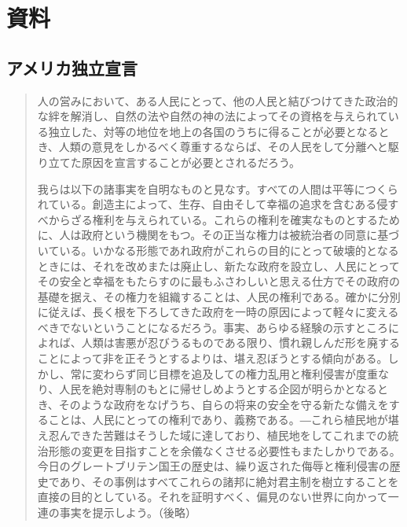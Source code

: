 \documentclass[uplatex,dvipdfmx]{jsarticle} \usepackage{mystyle}%
\begin{document}
\section{資料}



\subsection{アメリカ独立宣言}

\begin{quote}\footnotesize{}
  人の営みにおいて、ある人民にとって、他の人民と結びつけてきた政治的な絆を解消し、自然の法や自然の神の法によってその資格を与えられている独立した、対等の地位を地上の各国のうちに得ることが必要となるとき、人類の意見をしかるべく尊重するならば、その人民をして分離へと駆り立てた原因を宣言することが必要とされるだろう。

  我らは以下の諸事実を自明なものと見なす。すべての人間は平等につくられている。創造主によって、生存、自由そして幸福の追求を含むある侵すべからざる権利を与えられている。これらの権利を確実なものとするために、人は政府という機関をもつ。その正当な権力は被統治者の同意に基づいている。いかなる形態であれ政府がこれらの目的にとって破壊的となるときには、それを改めまたは廃止し、新たな政府を設立し、人民にとってその安全と幸福をもたらすのに最もふさわしいと思える仕方でその政府の基礎を据え、その権力を組織することは、人民の権利である。確かに分別に従えば、長く根を下ろしてきた政府を一時の原因によって軽々に変えるべきでないということになるだろう。事実、あらゆる経験の示すところによれば、人類は害悪が忍びうるものである限り、慣れ親しんだ形を廃することによって非を正そうとするよりは、堪え忍ぼうとする傾向がある。しかし、常に変わらず同じ目標を追及しての権力乱用と権利侵害が度重なり、人民を絶対専制のもとに帰せしめようとする企図が明らかとなるとき、そのような政府をなげうち、自らの将来の安全を守る新たな備えをすることは、人民にとっての権利であり、義務である。{\――}これら植民地が堪え忍んできた苦難はそうした域に達しており、植民地をしてこれまでの統治形態の変更を目指すことを余儀なくさせる必要性もまたしかりである。今日のグレートブリテン国王の歴史は、繰り返された侮辱と権利侵害の歴史であり、その事例はすべてこれらの諸邦に絶対君主制を樹立することを直接の目的としている。それを証明すべく、偏見のない世界に向かって一連の事実を提示しよう。（後略）

\end{quote}
\end{document}
